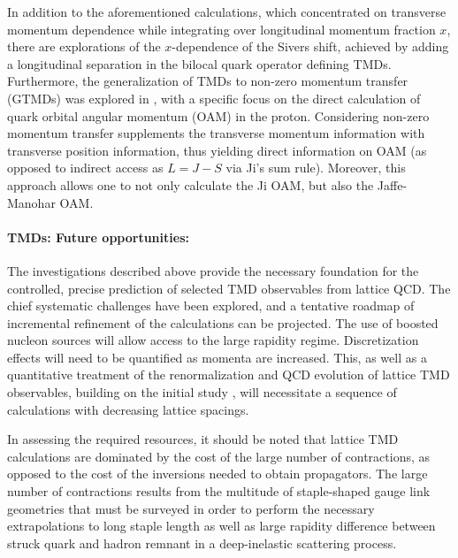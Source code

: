 In addition to the aforementioned calculations, which concentrated on
transverse momentum dependence while integrating over longitudinal
momentum fraction $x$, there are explorations of the
$x$-dependence of the Sivers shift, achieved by adding a
longitudinal separation in the bilocal quark operator defining TMDs.
Furthermore, the generalization
of TMDs to non-zero momentum transfer (GTMDs) was explored in
\cite{Engelhardt:2017miy}, with a specific focus on the direct
calculation of quark orbital angular momentum (OAM) in the proton.
Considering non-zero momentum transfer supplements the transverse
momentum information with transverse position information, thus
yielding direct information on OAM (as opposed to indirect access
as $L=J-S$ via Ji's sum rule). Moreover, this approach allows one
to not only calculate the Ji OAM, but also the Jaffe-Manohar OAM.

\paragraph{TMDs: Future opportunities:}

The investigations described above provide the necessary foundation for
the controlled, precise prediction of selected TMD observables from
lattice QCD. The chief systematic challenges have been explored,
and a tentative roadmap of incremental refinement of the calculations can
be projected. The use of boosted nucleon sources will allow access to the large
rapidity regime. Discretization effects will need to be quantified
as momenta are increased. This, as well as a quantitative treatment
of the renormalization and QCD evolution of lattice TMD observables,
building on the initial study \cite{Yoon:2017qzo}, will necessitate a
sequence of calculations with decreasing lattice spacings.

In assessing the required resources, it should be noted that lattice
TMD calculations are dominated by the cost of the large number of
contractions, as opposed to the cost of the inversions needed to
obtain propagators. The large number of contractions results from the multitude of
staple-shaped gauge link geometries that must be surveyed in order
to perform the necessary extrapolations to long staple length as
well as large rapidity difference between struck quark and hadron
remnant in a deep-inelastic scattering process. 

